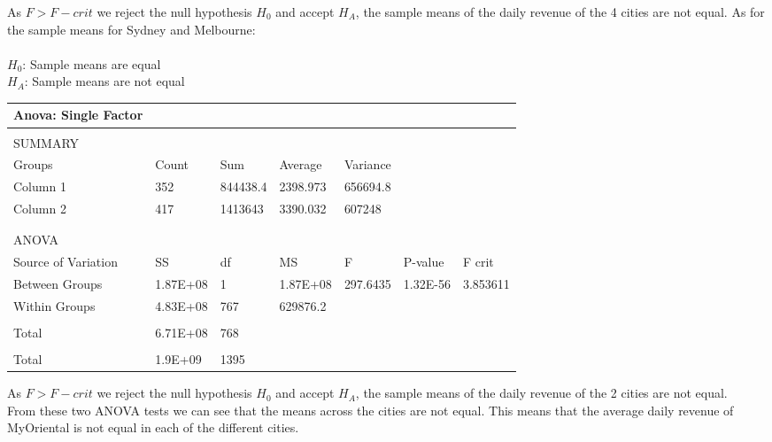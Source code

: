 \documentclass[11pt]{article}
\begin{document}
As $F > F-crit$ we reject the null hypothesis $H_0$ and accept $H_A$, the sample means of the daily revenue of the 4 cities are not equal.
\newpage As for the sample means for Sydney and Melbourne:\\ \\
$H_0$: Sample means are equal\\
$H_A$: Sample means are not equal\\

\begin{table}[h]
\begin{tabular}{@{}lllllll@{}}
\toprule
Anova: Single   Factor &          &          &          &          &          &          \\ \midrule
                       &          &          &          &          &          &          \\
SUMMARY                &          &          &          &          &          &          \\
Groups                 & Count    & Sum      & Average  & Variance &          &          \\
Column 1               & 352      & 844438.4 & 2398.973 & 656694.8 &          &          \\
Column 2               & 417      & 1413643  & 3390.032 & 607248   &          &          \\
                       &          &          &          &          &          &          \\
                       &          &          &          &          &          &          \\ \midrule
ANOVA                  &          &          &          &          &          &          \\ \midrule
Source of Variation    & SS       & df       & MS       & F        & P-value  & F crit   \\
Between Groups         & 1.87E+08 & 1        & 1.87E+08 & 297.6435 & 1.32E-56 & 3.853611 \\
Within Groups          & 4.83E+08 & 767      & 629876.2 &          &          &          \\
                       &          &          &          &          &          &          \\
Total                  & 6.71E+08 & 768      &          &          &          &          \\
                       &          &          &          &          &          &          \\
Total                  & 1.9E+09  & 1395     &          &          &          &          \\ \bottomrule
\end{tabular}
\end{table}
As $F > F-crit$ we reject the null hypothesis $H_0$ and accept $H_A$, the sample means of the daily revenue of the 2 cities are not equal.\\

From these two ANOVA tests we can see that the means across the cities are not equal. This means that the average daily revenue of MyOriental is not equal in each of the different cities.
\end{document}
